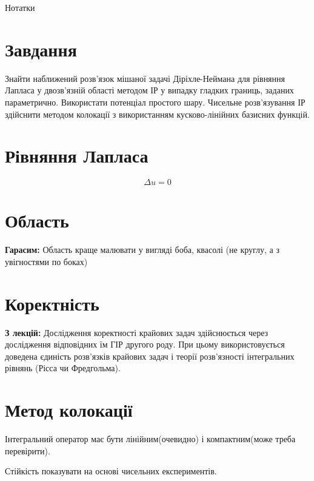 \documentclass[12pt,a4paper]{article}
\newcounter{e}
\begin{document}
 \begin{LARGE}
 Нотатки
 \end{LARGE}
	
 \thispagestyle{empty}
 \section{Завдання}
 Знайти наближений розв'язок мішаної задачі Діріхле-Неймана для рівняння Лапласа у двозв'язній області методом ІР у випадку гладких границь, заданих параметрично. Використати потенціал простого шару. Чисельне розв'язування ІР здійснити методом колокації з використанням кусково-лінійних базисних функцій.
 
 \section{Рівняння Лапласа}
 $$
 \Delta u = 0
 $$
 
 \section{Область}
 \textbf{Гарасим:} Область краще малювати у вигляді боба, квасолі (не круглу, а з увігностями по боках)
 
 \section{Коректність}
 \textbf{З лекцій:} Дослідження коректності крайових задач здійснюється через дослідження відповідних їм ГІР другого роду. При цьому використовується доведена єдиність розв'язків крайових задач і теорії розв'язності інтегральних рівнянь (Рісса чи Фредгольма).


 \section{Метод колокації}
 
 Інтегральний оператор має бути лінійним(очевидно) і компактним(може треба перевірити). 
 
 
 Стійкість показувати на основі чисельних експериментів.



 
\end{document}
